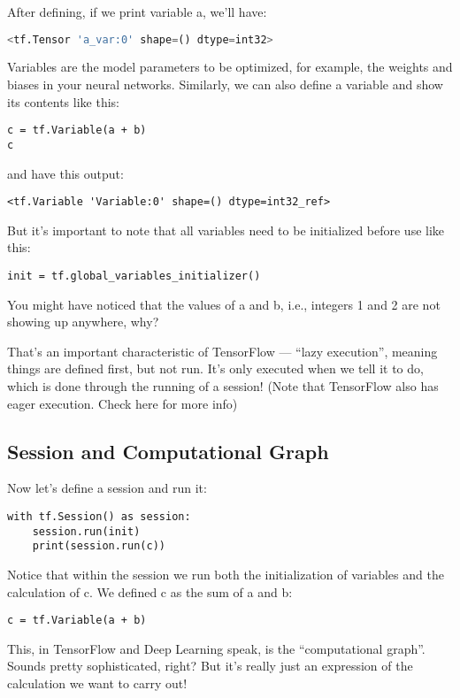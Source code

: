 After defining, if we print variable a, we'll have:

\begin{lstlisting}[language=Python]
<tf.Tensor 'a_var:0' shape=() dtype=int32>
\end{lstlisting}
Variables are the model parameters to be optimized, for example, the weights and biases in your neural networks. Similarly, we can also define a variable and show its contents like this:

\begin{lstlisting}
c = tf.Variable(a + b)
c
\end{lstlisting}
and have this output:

\begin{lstlisting}
<tf.Variable 'Variable:0' shape=() dtype=int32_ref>
\end{lstlisting}
But it's important to note that all variables need to be initialized before use like this:

\begin{lstlisting}
init = tf.global_variables_initializer()
\end{lstlisting}
You might have noticed that the values of a and b, i.e., integers 1 and 2 are not showing up anywhere, why?

That's an important characteristic of TensorFlow --- ``lazy execution'', meaning things are defined first, but not run. It's only executed when we tell it to do, which is done through the running of a session! (Note that TensorFlow also has eager execution. Check here for more info)

\subsection{Session and Computational Graph}

Now let's define a session and run it:

\begin{lstlisting}
with tf.Session() as session:                    
    session.run(init)                            
    print(session.run(c))
\end{lstlisting}
Notice that within the session we run both the initialization of variables and the calculation of c. We defined c as the sum of a and b:

\begin{lstlisting}
c = tf.Variable(a + b)
\end{lstlisting}
This, in TensorFlow and Deep Learning speak, is the ``computational graph''. Sounds pretty sophisticated, right? But it's really just an expression of the calculation we want to carry out!

